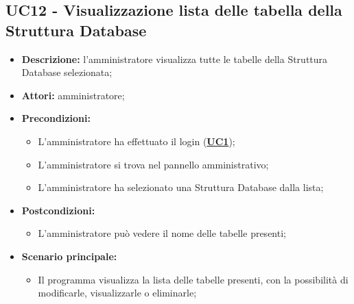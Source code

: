 \subsection{UC12 - Visualizzazione lista delle tabella della Struttura Database}
\label{sec:UC12}
\begin{itemize}
	\item \textbf{Descrizione:} l’amministratore visualizza tutte le tabelle della Struttura Database selezionata;
	\item \textbf{Attori:} amministratore;
	\item \textbf{Precondizioni:} 
	\begin{itemize}
		\item L’amministratore ha effettuato il login (\hyperref[sec:UC1]{\textbf{UC1}});
		\item L’amministratore si trova nel pannello amministrativo;
		\item L'amministratore ha selezionato una Struttura Database dalla lista;
	\end{itemize}
	\item \textbf{Postcondizioni:} 
	\begin{itemize}
		\item L'amministratore può vedere il nome delle tabelle presenti;
	\end{itemize}
	\item \textbf{Scenario principale:} 
	\begin{itemize}
		\item Il programma visualizza la lista delle tabelle presenti, con la possibilità di modificarle, visualizzarle o eliminarle;
	\end{itemize}
\end{itemize}

